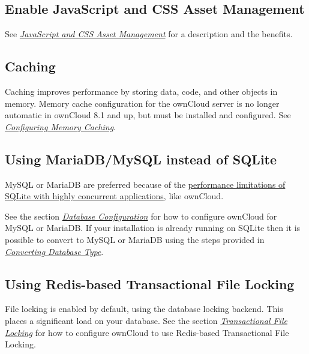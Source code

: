 \documentclass[letterpaper,10pt,english]{sphinxmanual}
\begin{document}
\subsection{Enable JavaScript and CSS Asset Management}
\label{configuration_server/oc_server_tuning:enable-javascript-and-css-asset-management}
See {\hyperref[configuration_server/js_css_asset_management_configuration::doc]{\emph{\emph{JavaScript and CSS Asset Management}}}} for a description and the
benefits.


\subsection{Caching}
\label{configuration_server/oc_server_tuning:caching}\label{configuration_server/oc_server_tuning:id1}
Caching improves performance by storing data, code, and other objects in memory.
Memory cache configuration for the ownCloud server is no longer automatic in
ownCloud 8.1 and up, but must be installed and configured. See
{\hyperref[configuration_server/caching_configuration::doc]{\emph{\emph{Configuring Memory Caching}}}}.


\subsection{Using MariaDB/MySQL instead of SQLite}
\label{configuration_server/oc_server_tuning:using-mariadb-mysql-instead-of-sqlite}
MySQL or MariaDB are preferred because of the \href{http://www.sqlite.org/whentouse.html}{performance limitations of
SQLite with highly concurrent applications}, like ownCloud.

See the section {\hyperref[configuration_database/linux_database_configuration::doc]{\emph{\emph{Database Configuration}}}} for how to
configure ownCloud for MySQL or MariaDB. If your installation is already running on
SQLite then it is possible to convert to MySQL or MariaDB using the steps provided
in {\hyperref[configuration_database/db_conversion::doc]{\emph{\emph{Converting Database Type}}}}.


\subsection{Using Redis-based Transactional File Locking}
\label{configuration_server/oc_server_tuning:using-redis-based-transactional-file-locking}
File locking is enabled by default, using the database locking backend. This
places a significant load on your database. See the section
{\hyperref[configuration_files/files_locking_transactional::doc]{\emph{\emph{Transactional File Locking}}}} for how to
configure ownCloud to use Redis-based Transactional File Locking.
\end{document}
